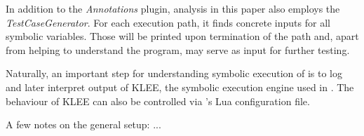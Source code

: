 
\bigskip

In addition to the \textit{Annotations} plugin, analysis in this paper also employs the \textit{TestCaseGenerator}.
For each execution path, it finds concrete inputs for all symbolic variables.
Those will be printed upon termination of the path and, apart from helping to understand the program, may serve as input for further testing.

\bigskip

Naturally, an important step for understanding symbolic execution of \app is to log and later interpret output of KLEE, the symbolic execution engine used in \sse.
The behaviour of KLEE can also be controlled via \sse's Lua configuration file.

A few notes on the general setup: ...\todo{}

\iffalse
§5 	Implementation (of the test case using S2E)
		> Vorgehen
		> Verwendete Konsistenzmodelle
		> Arbeitsweise von Selektoren/Analysatoren
\fi